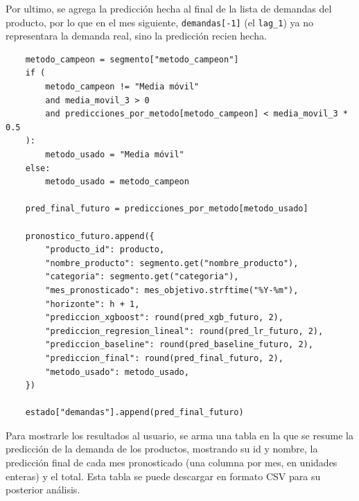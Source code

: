 Por ultimo, se agrega la predicción hecha al final de la lista de demandas del producto, por lo que en el mes siguiente, \texttt{demandas[-1]} (el \texttt{lag\_1}) ya no representara la demanda real, sino la predicción recien hecha.

\begin{verbatim}
    metodo_campeon = segmento["metodo_campeon"]
    if (
        metodo_campeon != "Media móvil"
        and media_movil_3 > 0
        and predicciones_por_metodo[metodo_campeon] < media_movil_3 * 0.5
    ):
        metodo_usado = "Media móvil"
    else:
        metodo_usado = metodo_campeon

    pred_final_futuro = predicciones_por_metodo[metodo_usado]

    pronostico_futuro.append({
        "producto_id": producto,
        "nombre_producto": segmento.get("nombre_producto"),
        "categoria": segmento.get("categoria"),
        "mes_pronosticado": mes_objetivo.strftime("%Y-%m"),
        "horizonte": h + 1,
        "prediccion_xgboost": round(pred_xgb_futuro, 2),
        "prediccion_regresion_lineal": round(pred_lr_futuro, 2),
        "prediccion_baseline": round(pred_baseline_futuro, 2),
        "prediccion_final": round(pred_final_futuro, 2),
        "metodo_usado": metodo_usado,
    })

    estado["demandas"].append(pred_final_futuro)
\end{verbatim}

Para mostrarle los resultados al usuario, se arma una tabla en la que se resume la predicción de la demanda de los productos, mostrando su id y nombre, la predicción final de cada mes pronosticado (una columna por mes, en unidades enteras) y el total. Esta tabla se puede descargar en formato CSV para su posterior análisis.
